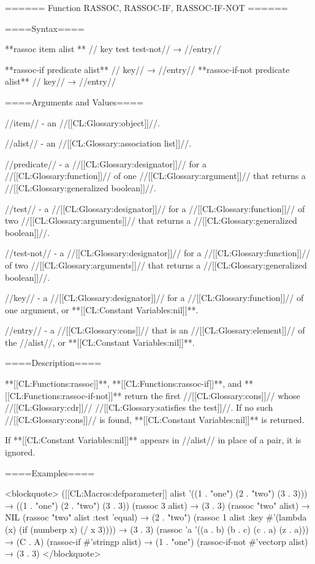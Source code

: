 ====== Function RASSOC, RASSOC-IF, RASSOC-IF-NOT ======

====Syntax====

**rassoc {item alist ** //\key} key test test-not// → //entry//

**rassoc-if {predicate alist** //\key} key// → //entry// **rassoc-if-not {predicate alist** //\key} key// → //entry//

====Arguments and Values====

//item// - an //[[CL:Glossary:object]]//.

//alist// - an //[[CL:Glossary:association list]]//.

//predicate// - a //[[CL:Glossary:designator]]// for a //[[CL:Glossary:function]]// of one //[[CL:Glossary:argument]]// that returns a //[[CL:Glossary:generalized boolean]]//.

//test// - a //[[CL:Glossary:designator]]// for a //[[CL:Glossary:function]]// of two //[[CL:Glossary:arguments]]// that returns a //[[CL:Glossary:generalized boolean]]//.

//test-not// - a //[[CL:Glossary:designator]]// for a //[[CL:Glossary:function]]// of two //[[CL:Glossary:arguments]]// that returns a //[[CL:Glossary:generalized boolean]]//.

//key// - a //[[CL:Glossary:designator]]// for a //[[CL:Glossary:function]]// of one argument, or **[[CL:Constant Variables:nil]]**.

//entry// - a //[[CL:Glossary:cons]]// that is an //[[CL:Glossary:element]]// of the //alist//, or **[[CL:Constant Variables:nil]]**.

====Description====

**[[CL:Functions:rassoc]]**, **[[CL:Functions:rassoc-if]]**, and **[[CL:Functions:rassoc-if-not]]** return the first //[[CL:Glossary:cons]]// whose //[[CL:Glossary:cdr]]// //[[CL:Glossary:satisfies the test]]//. If no such //[[CL:Glossary:cons]]// is found, **[[CL:Constant Variables:nil]]** is returned.

If **[[CL:Constant Variables:nil]]** appears in //alist// in place of a pair, it is ignored.

====Examples====

<blockquote> ([[CL:Macros:defparameter]] alist '((1 . "one") (2 . "two") (3 . 3))) → ((1 . "one") (2 . "two") (3 . 3)) (rassoc 3 alist) → (3 . 3) (rassoc "two" alist) → NIL (rassoc "two" alist :test 'equal) → (2 . "two") (rassoc 1 alist :key #'(lambda (x) (if (numberp x) (/ x 3)))) → (3 . 3) (rassoc 'a '((a . b) (b . c) (c . a) (z . a))) → (C . A) (rassoc-if #'stringp alist) → (1 . "one") (rassoc-if-not #'vectorp alist) → (3 . 3) </blockquote>

